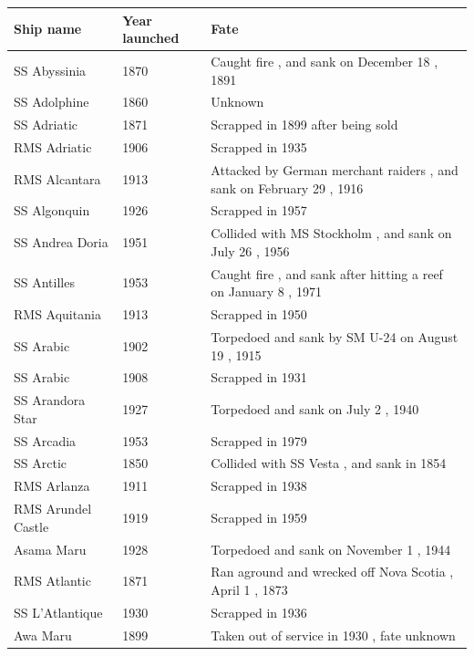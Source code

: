 \documentclass{article}
\begin{document}
\begin{tabular}{lll}
\toprule
Ship name & Year launched & Fate \\
\midrule
SS Abyssinia & 1870 & Caught fire , and sank on December 18 , 1891 \\
SS Adolphine & 1860 & Unknown \\
SS Adriatic & 1871 & Scrapped in 1899 after being sold \\
RMS Adriatic & 1906 & Scrapped in 1935 \\
RMS Alcantara & 1913 & Attacked by German merchant raiders , and sank on February 29 , 1916 \\
SS Algonquin & 1926 & Scrapped in 1957 \\
SS Andrea Doria & 1951 & Collided with MS Stockholm , and sank on July 26 , 1956 \\
SS Antilles & 1953 & Caught fire , and sank after hitting a reef on January 8 , 1971 \\
RMS Aquitania & 1913 & Scrapped in 1950 \\
SS Arabic & 1902 & Torpedoed and sank by SM U-24 on August 19 , 1915 \\
SS Arabic & 1908 & Scrapped in 1931 \\
SS Arandora Star & 1927 & Torpedoed and sank on July 2 , 1940 \\
SS Arcadia & 1953 & Scrapped in 1979 \\
SS Arctic & 1850 & Collided with SS Vesta , and sank in 1854 \\
RMS Arlanza & 1911 & Scrapped in 1938 \\
RMS Arundel Castle & 1919 & Scrapped in 1959 \\
Asama Maru & 1928 & Torpedoed and sank on November 1 , 1944 \\
RMS Atlantic & 1871 & Ran aground and wrecked off Nova Scotia , April 1 , 1873 \\
SS L'Atlantique & 1930 & Scrapped in 1936 \\
Awa Maru & 1899 & Taken out of service in 1930 , fate unknown \\
\bottomrule
\end{tabular}
\end{document}
